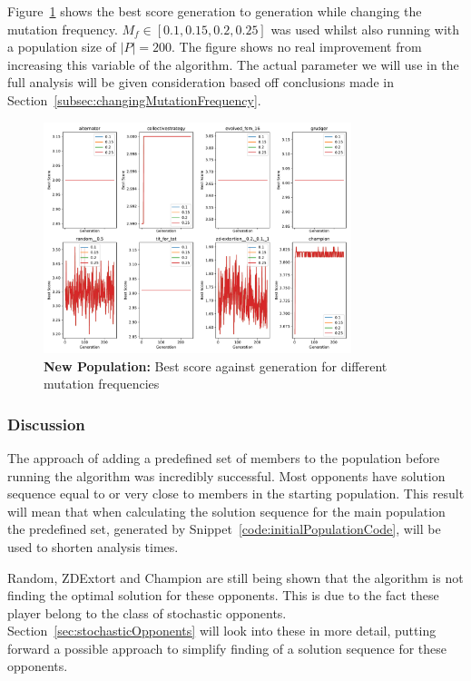 Figure~\ref{fig:NEW-MUT-FREQ-bs-gen-all} shows the best score generation to generation while changing the mutation frequency.
\(M_f \in [0.1,0.15,0.2,0.25] \) was used whilst also running with a population size of \(|P|=200\).
The figure shows no real improvement from increasing this variable of the algorithm.
The actual parameter we will use in the full analysis will be given consideration based off conclusions made in Section~\ref{subsec:changingMutationFrequency}.

\begin{figure}[h]
    \includegraphics[width=0.8\textwidth, keepaspectratio, center]{./img/plots/NEW_MUT_FREQ_bs_v_gen_all.pdf}
    \caption{\textbf{New Population:} Best score against generation for different mutation frequencies}\label{fig:NEW-MUT-FREQ-bs-gen-all}
\end{figure}

\subsubsection{Discussion}\label{subsubsec:discussion}
The approach of adding a predefined set of members to the population before running the algorithm was incredibly successful.
Most opponents have solution sequence equal to or very close to members in the starting population.
This result will mean that when calculating the solution sequence for the main population the predefined set, generated by Snippet~\ref{code:initialPopulationCode}, will be used to shorten analysis times.

Random, ZDExtort and Champion are still being shown that the algorithm is not finding the optimal solution for these opponents.
This is due to the fact these player belong to the class of stochastic opponents.
Section~\ref{sec:stochasticOpponents} will look into these in more detail, putting forward a possible approach to simplify finding of a solution sequence for these opponents.


